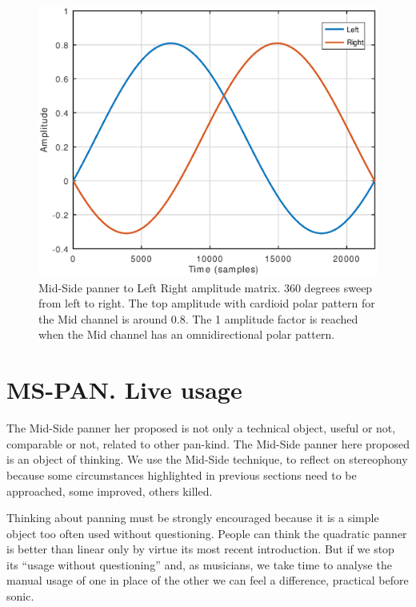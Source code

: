 \documentclass{article}
\begin{document}
\begin{figure}[h]
\centering
\includegraphics[width=1\columnwidth]{mspanlr}
\caption{Mid-Side panner to Left Right amplitude matrix. 360 degrees sweep from left to right. The top amplitude with cardioid polar pattern for the Mid channel is around 0.8. The 1 amplitude factor is reached when the Mid channel has an omnidirectional polar pattern.}
\label{fig:mspanlr}
\end{figure}

%

\section{MS-PAN. Live usage}
\label{sec:mspanlive}

The Mid-Side panner her proposed is not only a technical object, useful or not, comparable or not, related to other pan-kind. The Mid-Side panner here proposed is an object of thinking. We use the Mid-Side technique, to reflect on stereophony because some circumstances highlighted in previous sections need to be approached, some improved, others killed. 

Thinking about panning must be strongly encouraged because it is a simple object too often used without questioning. People can think the quadratic panner is better than linear only by virtue its most recent introduction. But if we stop its “usage without questioning” and, as musicians, we take time to analyse the manual usage of one in place of the other we can feel a difference, practical before sonic. 
\end{document}
